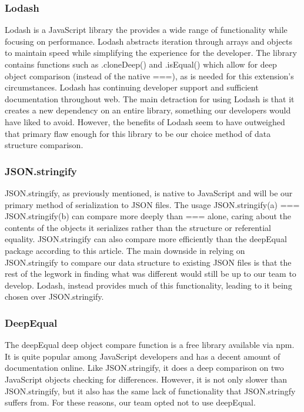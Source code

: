 \documentclass[letterpaper,10pt,titlepage,draftclsnofoot,onecolumn,onesided] {IEEEtran}
\begin{document}
\subsubsection{Lodash}
Lodash is a JavaScript library the provides a wide range of functionality while focusing on performance.
Lodash abstracts iteration through arrays and objects to maintain speed while simplifying the experience for the developer. 
The library contains functions such as .cloneDeep() and .isEqual() which allow for deep object comparison (instead of the native ===), as is needed for this extension's circumstances. 
Lodash has continuing developer support and sufficient documentation throughout web. 
The main detraction for using Lodash is that it creates a new dependency on an entire library, something our developers would have liked to avoid. 
However, the benefits of Lodash seem to have outweighed that primary flaw enough for this library to be our choice method of data structure comparison. \cite{lodash}

\subsubsection{JSON.stringify}
JSON.stringify, as previously mentioned, is native to JavaScript and will be our primary method of serialization to JSON files. 
The usage JSON.stringify(a) === JSON.stringify(b) can compare more deeply than === alone, caring about the contents of the objects it serializes rather than the structure or referential equality. 
JSON.stringify can also compare more efficiently than the deepEqual package according to this article. \cite{compare}
The main downside in relying on JSON.stringify to compare our data structure to existing JSON files is that the rest of the legwork in finding what was different would still be up to our team to develop. 
Lodash, instead provides much of this functionality, leading to it being chosen over JSON.stringify. \cite{stringify}

\subsubsection{DeepEqual}
The deepEqual deep object compare function is a free library available via npm. 
It is quite popular among JavaScript developers and has a decent amount of documentation online. 
Like JSON.stringify, it does a deep comparison on two JavaScript objects checking for differences.
However, it is not only slower than JSON.stringify, but it also has the same lack of functionality that JSON.stringfy suffers from. 
For these reasons, our team opted not to use deepEqual. \cite{deep}
\end{document}
